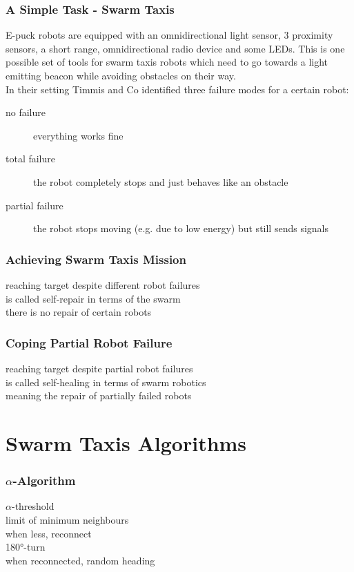 \documentclass[
	a4paper,
	article,
	pagesize,
	pdftex,
	12pt,
	english,
	fleqn,
	final,
	]{scrartcl}
\begin{document}
\subsubsection{A Simple Task - Swarm Taxis}
E-puck robots are equipped with an omnidirectional light sensor, 3 proximity sensors, a short range, omnidirectional radio device and some LEDs.
This is one possible set of tools for swarm taxis robots which need to go towards a light emitting beacon while avoiding obstacles on their way.\\

In their setting Timmis and Co identified three failure modes for a certain robot:
\begin{description}
	\item[no failure]
		everything works fine
	\item[total failure] the robot completely stops and just behaves like an obstacle
	\item[partial failure] the robot stops moving (e.g. due to low energy) but still sends signals
\end{description} 

\subsubsection{Achieving Swarm Taxis Mission}
\color{red}
reaching target despite different robot failures\\
is called self-repair in terms of the swarm\\
there is no repair of certain robots

\subsubsection{Coping Partial Robot Failure}
reaching target despite partial robot failures\\
is called self-healing in terms of swarm robotics\\
meaning the repair of partially failed robots

\section{Swarm Taxis Algorithms}

\subsubsection{$\alpha$-Algorithm}
$\alpha$-threshold\\
limit of minimum neighbours\\
when less, reconnect\\
180°-turn\\
when reconnected, random heading
\end{document}

